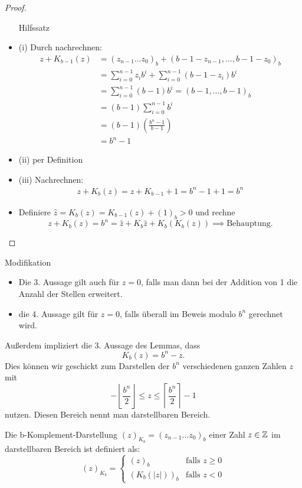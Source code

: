 \begin{proof}
\begin{itemize}Hilfssatz \\
	\item (i) Durch nachrechnen:
		\begin{align*}
		z+K_{b-1}(z)
		&=(z_{n-1} \ldots z_0)_b +(b-1-z_{n-1}, \ldots, b-1-z_0)_b \\
		&=\sum_{i=0}^{n-1}z_ib^{i}+ \sum_{i=0}^{n-1}(b-1-z_i)b^{i}\\
		&= \sum_{i=0}^{n-1}(b-1)b^{i} = (b-1, \ldots, b-1)_b \\
		&= (b-1)\sum_{i=0}^{n-1}b^{i} \\
		&=(b-1)\left( \frac{b^{n}-1}{b-1} \right) \\
		&= b^{n}-1
		\end{align*}
	\item (ii) per Definition
	\item (iii) Nachrechnen:
	\begin{align*}
		z+K_b(z) = z+K_{b-1} + 1 = b^{n}-1+1=b^{n}
	\end{align*}
	\item Definiere $\hat{z} = K_b\left( z \right)= K_{b-1}(z) + (1)_b > 0$ und rechne
		\[
		z+K_b(z)=b^{n}=\hat{z} +K_b{\hat{z}}+ K_b\left( K_b(z) \right) \implies \text{Behauptung.}
		\]
\end{itemize}



\end{proof}

\begin{remark} Modifikation 
\begin{itemize}
	\item Die 3. Aussage gilt auch für $z=0$, falls man dann bei der Addition von 1 die Anzahl der Stellen erweitert.
	\item die 4. Aussage gilt für $z=0$, falls überall im Beweis modulo $b^{n}$ gerechnet wird.
\end{itemize}
\end{remark}
Außerdem impliziert die 3. Aussage des Lemmas, dass 
\begin{equation}\label{eqn:komplement}
	K_b(z)=b^{n}-z \text{.}
\end{equation}
Dies können wir geschickt zum Darstellen der $b^{n}$ verschiedenen ganzen Zahlen $z$ mit 
\[
-\left\lfloor \frac{b^{n}}{2}\right\rfloor \le z \le \left\lceil \frac{b^{n}}{2}\right\rceil -1
\]
nutzen. Diesen Bereich nennt man darstellbaren Bereich.
\begin{definition}
	Die b-Komplement-Darstellung $(z)_{K_b} = (z_{n-1} \ldots z_0)_b$ einer Zahl $z \in  \mathbb{Z}$ im darstellbaren Bereich ist definiert als:
	\[
		(z)_{K_b}= \begin{cases}
			(z)_b & \text{falls } z \ge 0 \\
			\left( K_b(|z|) \right)_b & \text{falls } z<0
		\end{cases}
	\]
\end{definition}

